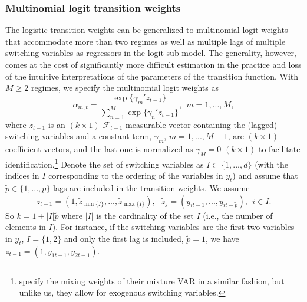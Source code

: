 \documentclass[nojss]{jss}
\begin{document}
\subsubsection{Multinomial logit transition weights}

The logistic transition weights can be generalized to multinomial logit weights that accommodate more than two regimes as well as multiple lags of multiple switching variables as regressors in the logit sub model. The generality, however, comes at the cost of significantly more difficult estimation in the practice and loss of the intuitive interpretations of the parameters of the transition function.  With $M\geq 2$ regimes, we specify the multinomial logit weights as
\begin{equation}\label{eq:logistic_alphas}
\alpha_{m,t} = \frac{\exp\lbrace{\gamma_m'z_{t-1}\rbrace}}{\sum_{n=1}^M \exp\lbrace{\gamma_n'z_{t-1} \rbrace}}, \ \ m=1,...,M,
\end{equation}
where $z_{t-1}$ is an $(k\times 1)$ $\mathcal{F}_{t-1}$-measurable vector containing the (lagged) switching variables and a constant term, $\gamma_m$, $m=1,...,M-1$, are $(k\times 1)$ coefficient vectors, and the last one is normalized as $\gamma_M=0$ $(k\times 1)$ to facilitate identification.\footnote{\cite{Burgard+Neuenkirch+Nockel:2019} specify the mixing weights of their mixture VAR in a similar fashion, but unlike us, they allow for exogenous switching variables.}
Denote the set of switching variables as $I\subset \lbrace 1,...,d \rbrace$ (with the indices in $I$ corresponding to the ordering of the variables in $y_t$) and assume that $\tilde{p} \in \lbrace 1,...,p \rbrace$ lags are included in the transition weights. We assume
\begin{equation}
z_{t-1} = (1, \tilde{z}_{\min\lbrace I\rbrace},...,\tilde{z}_{\max\lbrace I\rbrace}), \ \ \ \tilde{z}_{j} =(y_{it-1},...,y_{it-\tilde{p}}), \ \ i\in I.
\end{equation}
So $k=1+|I|\tilde{p}$ where $|I|$ is the cardinality of the set $I$ (i.e., the number of elements in $I$). For instance, if the switching variables are the first two variables in $y_t$, $I=\lbrace 1,2 \rbrace$ and only the first lag is included, $\tilde{p}=1$, we have $z_{t-1} = (1,y_{1t-1}, y_{2t-1})$.
\end{document}
